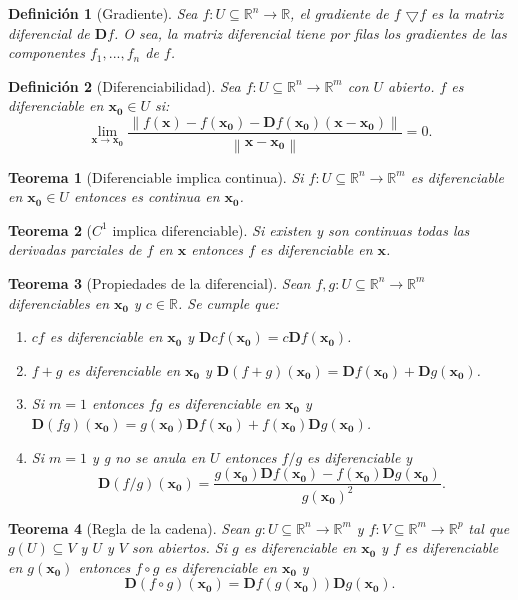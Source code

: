 \documentclass[a4paper,spanish]{article}
\newcommand{\R}[0]{\mathbb{R}}
\newcommand{\norma}[1]{\left\|#1\right\|}
\newcommand{\limite}[2]{\lim_{ #1 \rightarrow #2}}
\newcommand{\xx}[0]{\mathbf{x}}
\newcommand{\xO}[0]{\mathbf{x_0}}
\newcommand{\comp}[0]{\circ}
\newcommand{\D}[0]{\mathbf{D}}
\newcommand{\grad}[0]{\bigtriangledown}
\newtheorem{teo}{Teorema}
\newtheorem{defi}{Definici\'on}
\begin{document}
\begin{defi}[Gradiente]
\label{def-gradiente}
Sea $f : U \subseteq \R^n \to \R$, el \emph{gradiente} de $f$ $\grad f$ es la
matriz diferencial de $\D f$. O sea, la matriz diferencial tiene por filas
los gradientes de las componentes $f_1,...,f_n$ de $f$.
\end{defi}

\begin{defi}[Diferenciabilidad]
\label{def-diferenciabilidad}
Sea $f : U \subseteq \R^n \to \R^m$ con $U$ abierto. $f$ es
\emph{diferenciable} en $\xO \in U$ si:
$$\limite{\xx}{\xO}\frac{\norma{f(\xx) - f(\xO) - \D f(\xO) (\xx - \xO)}}
                   {{\norma{\xx - \xO}}} = 0.$$
\end{defi}

\begin{teo}[Diferenciable implica continua]
\label{teo-diferenciable-continua}
Si $f : U \subseteq \R^n \to \R^m$ es diferenciable en $\xO \in U$ entonces es
continua en $\xO$.
\end{teo}

\begin{teo}[$C^1$ implica diferenciable]
\label{teo-c1-diferenciable}
Si existen y son continuas todas las derivadas parciales de $f$ en $\xx$ 
entonces $f$ es diferenciable en $\xx$.
\end{teo}

\begin{teo}[Propiedades de la diferencial]
\label{teo-propiedades-diferencial}
Sean $f,g : U \subseteq \R^n \to \R^m$ diferenciables en $\xO$ y $c \in \R$. 
Se cumple que:
\begin{enumerate}[i]
\item $cf$ es diferenciable en $\xO$ y $\D cf(\xO) = c \D f(\xO)$.
\item $f + g$ es diferenciable en $\xO$ y 
	$\D (f+g)(\xO) = \D f(\xO) + \D g(\xO)$.
\item Si $m = 1$ entonces $fg$ es diferenciable en $\xO$ y 
	$\D (fg) (\xO) = g(\xO) \D f(\xO) + f(\xO) \D g(\xO)$.
\item Si $m = 1$ y g no se anula en $U$ entonces $f/g$ es diferenciable y
$$\D (f/g) (\xO) = \frac{g(\xO) \D f(\xO) - f(\xO) \D g(\xO)}{g(\xO)^2}.$$
\end{enumerate}
\end{teo}

\begin{teo}[Regla de la cadena]
\label{teo-cadena}
Sean $g : U \subseteq \R^n \to \R^m$ y $f : V \subseteq \R^m \to \R^p$ tal
que $g(U) \subseteq V$ y $U$ y $V$ son abiertos. Si $g$ es diferenciable en
$\xO$ y $f$ es diferenciable en $g(\xO)$ entonces $f \comp g$ es diferenciable
en $\xO$ y
$$\D (f \comp g)(\xO) = \D f(g(\xO)) \D g(\xO).$$
\end{teo}
\end{document}
